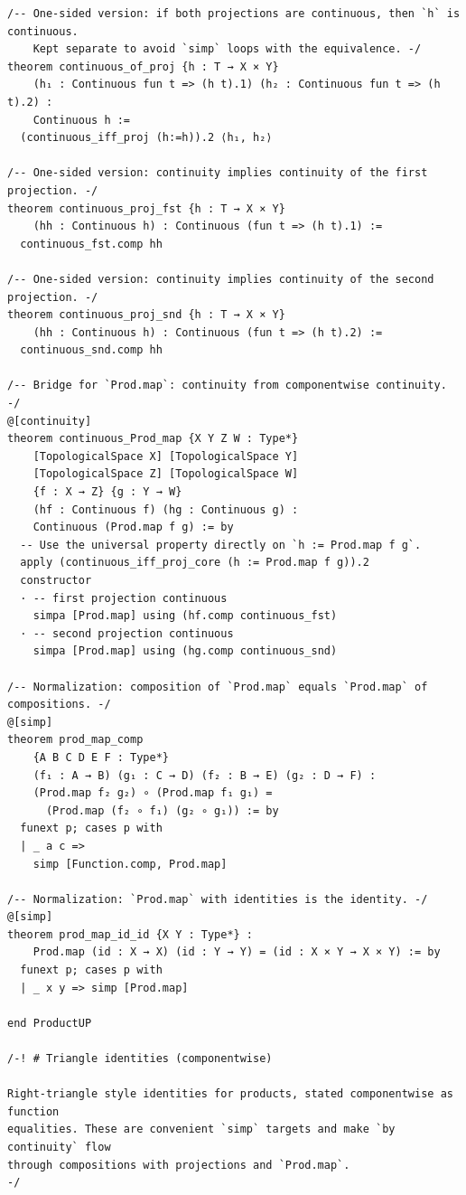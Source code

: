 \documentclass[11pt]{article}
\theoremstyle{definition}
\begin{document}
\begin{lstlisting}[language=lean]
/-- One-sided version: if both projections are continuous, then `h` is continuous.
    Kept separate to avoid `simp` loops with the equivalence. -/
theorem continuous_of_proj {h : T → X × Y}
    (h₁ : Continuous fun t => (h t).1) (h₂ : Continuous fun t => (h t).2) :
    Continuous h :=
  (continuous_iff_proj (h:=h)).2 ⟨h₁, h₂⟩

/-- One-sided version: continuity implies continuity of the first projection. -/
theorem continuous_proj_fst {h : T → X × Y}
    (hh : Continuous h) : Continuous (fun t => (h t).1) :=
  continuous_fst.comp hh

/-- One-sided version: continuity implies continuity of the second projection. -/
theorem continuous_proj_snd {h : T → X × Y}
    (hh : Continuous h) : Continuous (fun t => (h t).2) :=
  continuous_snd.comp hh

/-- Bridge for `Prod.map`: continuity from componentwise continuity. -/
@[continuity]
theorem continuous_Prod_map {X Y Z W : Type*}
    [TopologicalSpace X] [TopologicalSpace Y]
    [TopologicalSpace Z] [TopologicalSpace W]
    {f : X → Z} {g : Y → W}
    (hf : Continuous f) (hg : Continuous g) :
    Continuous (Prod.map f g) := by
  -- Use the universal property directly on `h := Prod.map f g`.
  apply (continuous_iff_proj_core (h := Prod.map f g)).2
  constructor
  · -- first projection continuous
    simpa [Prod.map] using (hf.comp continuous_fst)
  · -- second projection continuous
    simpa [Prod.map] using (hg.comp continuous_snd)

/-- Normalization: composition of `Prod.map` equals `Prod.map` of compositions. -/
@[simp]
theorem prod_map_comp
    {A B C D E F : Type*}
    (f₁ : A → B) (g₁ : C → D) (f₂ : B → E) (g₂ : D → F) :
    (Prod.map f₂ g₂) ∘ (Prod.map f₁ g₁) =
      (Prod.map (f₂ ∘ f₁) (g₂ ∘ g₁)) := by
  funext p; cases p with
  | _ a c =>
    simp [Function.comp, Prod.map]

/-- Normalization: `Prod.map` with identities is the identity. -/
@[simp]
theorem prod_map_id_id {X Y : Type*} :
    Prod.map (id : X → X) (id : Y → Y) = (id : X × Y → X × Y) := by
  funext p; cases p with
  | _ x y => simp [Prod.map]

end ProductUP

/-! # Triangle identities (componentwise)

Right-triangle style identities for products, stated componentwise as function
equalities. These are convenient `simp` targets and make `by continuity` flow
through compositions with projections and `Prod.map`.
-/


\end{lstlisting}
\end{document}
